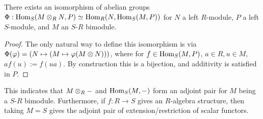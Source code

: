 \documentclass{article}
\begin{document}
\begin{proposition}
    There exists an isomorphism of abelian groups $\Phi: \mathrm{Hom}_S(M \otimes_R N, P) \simeq \mathrm{Hom}_R(N, \mathrm{Hom}_S(M, P))$ for $N$ a left $R$-module, $P$ a left $S$-module, and $M$ an $S$-$R$ bimodule. 
\end{proposition}

\begin{proof}
    The only natural way to define this isomorphism is via $\Phi(\varphi) = (N \mapsto (M \mapsto \varphi(M \otimes N)))$, where for $f\in \mathrm{Hom}_S(M, P)$, $a \in R, u \in M$, $af(u) := f(ua)$. By construction this is a bijection, and additivity is satisfied in $P$.
\end{proof}

\begin{remark}
    This indicates that $M \otimes_R -$ and $\mathrm{Hom}_S(M, -)$ form an adjoint pair for $M$ being a $S$-$R$ bimodule. Furthermore, if $f: R \to S$ gives an $R$-algebra structure, then taking $M = S$ gives the adjoint pair of extension/restriction of scalar functors.
\end{remark}
\end{document}
